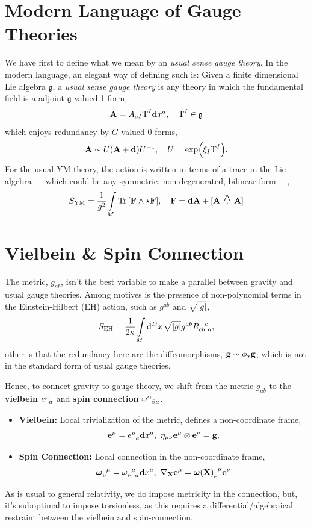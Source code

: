 \documentclass[a0,portrait]{a0poster}
\newcommand{\wedgecomma}{\stackon[1pt]{,}{\smash{\scriptsize$\wedge$}}}
\newcommand{\wedgecomm}[2]{\qty[ #1\ \wedgecomma\ #2 ]}
\begin{document}
\begin{multicols}{2}

\section*{Modern Language of Gauge Theories}

We have first to define what we mean by an \textit{usual sense gauge theory}. In the modern language, an 
elegant way of defining such is: Given a finite dimensional Lie algebra $\mathfrak g$, a \textit{usual sense gauge theory} is 
any theory in which the fundamental field is a adjoint $\mathfrak g$ valued 1-form, \[\vb A= A_{a I }\textnormal{T}^I\vb dx^a,\ \ \ \textnormal{T}^I\in\mathfrak g\] 
which enjoys redundancy by $G$ valued 0-forms, \[\vb A\sim U\qty(\vb A+\vb d)U^{-1},\ \ \ U=\exp(\xi_I\textnormal{T}^I).\] 
For the usual YM theory, the action is written in terms of a trace in the Lie algebra --- which could be any symmetric, non-degenerated, bilinear form ---,
\[ S_{\textnormal{YM}}= \frac{1}{g^2}\int\limits_M\Tr\qty[\vb F\wedge \star \vb F],\ \ \ \vb F = \vb d\vb A+\wedgecomm{\vb A}{\vb A}\]

\section*{Vielbein \& Spin Connection}

The metric, $g_{ab}$, isn't the best variable to make a parallel between gravity and usual gauge theories. Among motives is 
the presence of non-polynomial terms in the Einstein-Hilbert (EH) action, such as $g^{ab}$ and $\sqrt{\abs{g}}$,
\[S_{\textnormal{EH}}=\frac{1}{2\kappa}\int\limits_M \dd[D]{x}\sqrt{\abs{g}}g^{ab}\tensor{R}{_c_b^c_a},\]
other is that the redundancy here are the diffeomorphisms, $\vb g \sim \phi_\ast\vb g$, which is not in the standard form of usual 
gauge theories.

Hence, to connect gravity to gauge theory, we shift from the metric $g_{ab}$ to the \textbf{vielbein} $\tensor{e}{^\mu_a}$ and \textbf{spin connection} $\tensor{\omega}{^\alpha_\beta_a}$.

\begin{itemize}
    \item \textbf{Vielbein:} Local trivialization of the metric, defines a non-coordinate frame,\[\vb e^\mu=\tensor{ e}{^\mu_a}\vb dx^a,\ \eta_{\mu\nu}\vb e^\mu\otimes\vb e^\nu=\vb g,\]
    \item \textbf{Spin Connection:} Local connection in the non-coordinate frame, \[\tensor{\boldsymbol \omega}{_\nu^\mu}=\tensor{ \omega}{_\nu^\mu_a}\vb d x^a,\ \nabla_{\vb X} \vb e^\mu=\tensor{\boldsymbol \omega\qty(\vb X)}{_\nu^\mu}\vb e^\nu\]
\end{itemize}
As is usual to general relativity, we do impose metricity in the connection, but, it's suboptimal to impose 
torsionless, as this requires a differential/algebraical restraint between the vielbein and spin-connection.


\end{multicols}
\end{document}
